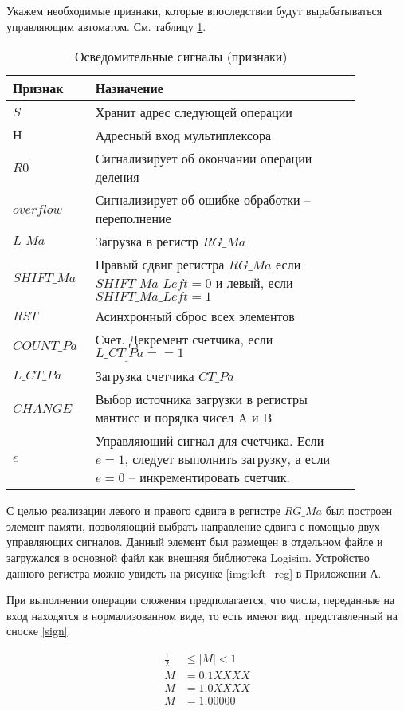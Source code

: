 \documentclass[a4paper,14pt]{extarticle}
\begin{document}
Укажем необходимые признаки, которые впоследствии будут вырабатываться управляющим автоматом. См. таблицу \ref{tab:signals}.
\begin{table}[h!]
	\centering
	\small
	\begin{tabular}{|m{0.17\linewidth}|m{0.7\linewidth}|}
		\hline
		\textbf{Признак} & \textbf{Назначение} \\ \hline
		$S$ & Хранит адрес следующей операции \\ \hline
		$Н$ & Адресный вход мультиплексора \\ \hline
		$R0$ & Сигнализирует об окончании операции деления \\ \hline
		$overflow$ & Сигнализирует об ошибке обработки -- переполнение \\ \hline
		$L\_Ma$ & Загрузка в регистр $RG\_Ma$ \\ \hline
		$SHIFT\_Ma$ & Правый сдвиг регистра $RG\_Ma$ если $SHIFT\_Ma\_Left=0$ и левый, если  $SHIFT\_Ma\_Left=1$ \\ \hline
		$RST$ & Асинхронный сброс всех элементов \\ \hline
		$COUNT\_Pa$ & Счет. Декремент счетчика, если $L\_CT_\_Pa==1$ \\ \hline
		$L\_CT\_Pa$ & Загрузка счетчика $CT\_Pa$ \\ \hline
		$CHANGE$ & Выбор источника загрузки в регистры мантисс и порядка чисел A и B \\ \hline
		$e$ & Управляющий сигнал для счетчика. Если $e=1$, следует выполнить загрузку, а если $e=0$ -- инкрементировать счетчик. \\ \hline
	\end{tabular}
	\caption{Осведомительные сигналы (признаки)}
	\label{tab:signals}
\end{table}
\newpage
С целью реализации левого и правого сдвига в регистре $RG\_Ma$ был построен элемент памяти, позволяющий выбрать направление сдвига с помощью двух управляющих сигналов. Данный элемент был размещен в отдельном файле и загружался в основной файл как внешняя библиотека Logisim. Устройство данного регистра можно увидеть на рисунке \ref{img:left_reg} в \hyperref[tam]{Приложении А}.

При выполнении операции сложения предполагается, что числа, переданные на вход находятся в нормализованном виде, то есть имеют вид, представленный на сноске \ref{sign}.

\begin{equation}
\begin{aligned}
\label{sign}
\frac12&\le \left|M\right|< 1\\
M &= 0.1XXXX\\
M &= 1.0XXXX\\
M&=1.00000\\
\end{aligned}
\end{equation}
\end{document}
